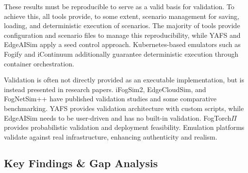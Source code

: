 These results must be reproducible to serve as a valid basis for validation.
To achieve this, all tools provide, to some extent, scenario management for saving, loading, and deterministic execution of scenarios.
The majority of tools provide configuration and scenario files to manage this reproducibility, while YAFS and EdgeAISim apply a seed control approach.
Kubernetes-based emulators such as Fogify and iContinuum additionally guarantee deterministic execution through container orchestration. 

Validation is often not directly provided as an executable implementation, but is instead presented in research papers.
iFogSim2, EdgeCloudSim, and FogNetSim++ have published validation studies and some comparative benchmarking.
YAFS provides validation architecture with custom scripts, while EdgeAISim needs to be user-driven and has no built-in validation.
FogTorch$\Pi$ provides probabilistic validation and deployment feasibility.
Emulation platforms validate against real infrastructure, enhancing authenticity and realism.

\subsection{Key Findings \& Gap Analysis}

